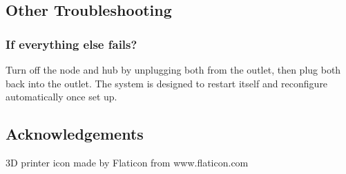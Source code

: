   \subsection{Other Troubleshooting}
  \subsubsection{If everything else fails?}
    Turn off the node and hub by unplugging both from the outlet, then plug both back into the outlet. The system
     is designed to restart itself and reconfigure automatically once set up.
   \subsection{Acknowledgements}
	3D printer icon made by Flaticon from www.flaticon.com 
